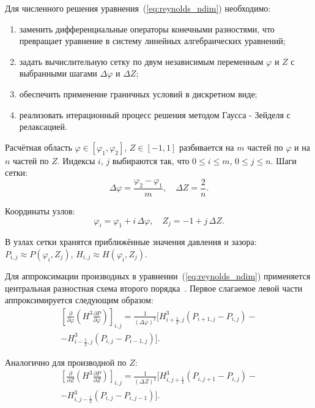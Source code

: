Для численного решения уравнения~(\ref{eq:reynolds_ndim}) необходимо:
\begin{enumerate}
    \item заменить дифференциальные операторы конечными разностями, что превращает уравнение в систему линейных алгебраических уравнений;
    \item задать вычислительную сетку по двум независимым переменным $\varphi$ и $Z$ с выбранными шагами $\Delta\varphi$ и $\Delta Z$;
    \item обеспечить применение граничных условий в дискретном виде;
    \item реализовать итерационный процесс решения методом Гаусса - Зейделя с релаксацией.
\end{enumerate}

Расчётная область $\varphi \in [\varphi_1, \varphi_2]$, $Z \in [-1, 1]$ разбивается на $m$ частей по $\varphi$ и на $n$ частей по $Z$. Индексы $i$, $j$ выбираются так, что $0 \leq i \leq m$, $0 \leq j \leq n$. Шаги сетки:
\begin{equation}
    \Delta\varphi = \frac{\varphi_2 - \varphi_1}{m}, \quad \Delta Z = \frac{2}{n}.
    \label{eq:grid_steps}
\end{equation}

Координаты узлов:
\begin{equation}
    \varphi_i = \varphi_1 + i\,\Delta\varphi, \quad Z_j = -1 + j\,\Delta Z.
    \label{eq:grid_nodes}
\end{equation}

В узлах сетки хранятся приближённые значения давления и зазора: $P_{i,j} \approx P(\varphi_i, Z_j)$, $H_{i,j} \approx H(\varphi_i, Z_j)$.

Для аппроксимации производных в уравнении~(\ref{eq:reynolds_ndim}) применяется центральная разностная схема второго порядка~\cite{hamrock}. Первое слагаемое левой части аппроксимируется следующим образом:
\begin{equation}
    \begin{split}
    \left[\frac{\partial}{\partial\varphi}\!\left(H^3 \frac{\partial P}{\partial\varphi}\right)\right]_{i,j} = \frac{1}{(\Delta\varphi)^2}\Big[H_{i+\frac12,j}^3(P_{i+1,j} - P_{i,j}) - {} \\
    - H_{i-\frac12,j}^3(P_{i,j} - P_{i-1,j})\Big].
    \end{split}
    \label{eq:fdm_phi}
\end{equation}

Аналогично для производной по $Z$:
\begin{equation}
    \begin{split}
    \left[\frac{\partial}{\partial Z}\!\left(H^3 \frac{\partial P}{\partial Z}\right)\right]_{i,j} = \frac{1}{(\Delta Z)^2}\Big[H_{i,j+\frac12}^3(P_{i,j+1} - P_{i,j}) - {} \\
    - H_{i,j-\frac12}^3(P_{i,j} - P_{i,j-1})\Big].
    \end{split}
    \label{eq:fdm_z}
\end{equation}

